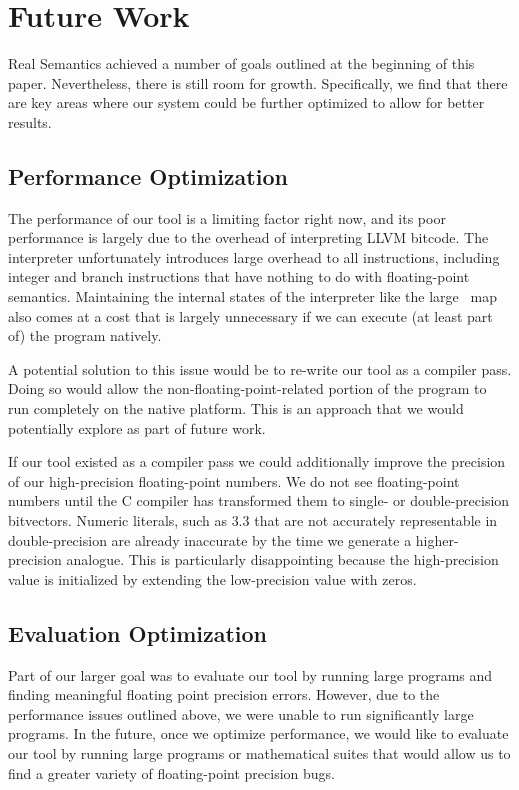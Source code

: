 \section{Future Work}
\label{sec:future}
Real Semantics achieved a number of goals outlined at the beginning of this paper. Nevertheless, there is still room for growth. Specifically, we find that there are key areas where our system could be further optimized to allow for better results.

\subsection{Performance Optimization}
The performance of our tool is a limiting factor right now, and its poor performance is largely due to the overhead of interpreting LLVM bitcode. The interpreter unfortunately introduces large overhead to all instructions, including integer and branch instructions that have nothing to do with floating-point semantics. Maintaining the internal states of the interpreter like the large \smartfloat~map also comes at a cost that is largely unnecessary if we can execute (at least part of) the program natively.

A potential solution to this issue would be to re-write our tool as a compiler pass. Doing so would allow the non-floating-point-related portion of the program to run completely on the native platform. This is an approach that we would potentially explore as part of future work.

If our tool existed as a compiler pass we could additionally improve the precision of our high-precision floating-point numbers. We do not see floating-point numbers until the C compiler has transformed them to single- or double-precision bitvectors. Numeric literals, such as $3.3$ that are not accurately representable in double-precision are already inaccurate by the time we generate a higher-precision analogue. This is particularly disappointing because the high-precision value is initialized by extending the low-precision value with zeros.

\subsection{Evaluation Optimization}
Part of our larger goal was to evaluate our tool by running large programs and finding meaningful floating point precision errors. However, due to the performance issues outlined above, we were unable to run significantly large programs. In the future, once we optimize performance, we would like to evaluate our tool by running large programs or mathematical suites that would allow us to find a greater variety of floating-point precision bugs.

